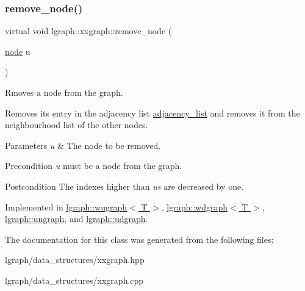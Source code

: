 \subsubsection{\texorpdfstring{remove\+\_\+node()}{remove\_node()}}
{\footnotesize\ttfamily virtual void lgraph\+::xxgraph\+::remove\+\_\+node (\begin{DoxyParamCaption}\item[{\hyperlink{namespacelgraph_a397169dd66adf725210a30fb7251773e}{node}}]{u }\end{DoxyParamCaption})\hspace{0.3cm}{\ttfamily [pure virtual]}}



Rmoves a node from the graph. 

Removes its entry in the adjacency list \hyperlink{classlgraph_1_1xxgraph_a31cf82d0b20be05290be259dc97a51ec}{adjacency\+\_\+list} and removes it from the neighbourhood list of the other nodes.


\begin{DoxyParams}{Parameters}
{\em u} & The node to be removed. \\
\hline
\end{DoxyParams}
\begin{DoxyPrecond}{Precondition}
{\itshape u} must be a node from the graph. 
\end{DoxyPrecond}
\begin{DoxyPostcond}{Postcondition}
The indexes higher than {\itshape u\textquotesingle{}s} are decreased by one. 
\end{DoxyPostcond}


Implemented in \hyperlink{classlgraph_1_1wugraph_ad8eff47efc751e7bc5aa10b79ff70633}{lgraph\+::wugraph$<$ T $>$}, \hyperlink{classlgraph_1_1wdgraph_aa6861b63fccd1def268f3ff84d31da52}{lgraph\+::wdgraph$<$ T $>$}, \hyperlink{classlgraph_1_1uugraph_aa7f32c48d008edaa4992eb72a176e806}{lgraph\+::uugraph}, and \hyperlink{classlgraph_1_1udgraph_a043aab345008c5eedb4cf429f85e99df}{lgraph\+::udgraph}.



The documentation for this class was generated from the following files\+:\begin{DoxyCompactItemize}
\item 
lgraph/data\+\_\+structures/xxgraph.\+hpp\item 
lgraph/data\+\_\+structures/xxgraph.\+cpp\end{DoxyCompactItemize}
